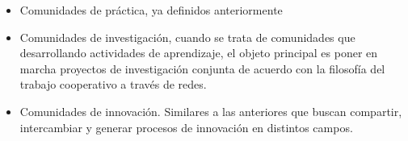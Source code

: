 \begin{description}
\begin{itemize}
\item Comunidades de práctica, ya definidos anteriormente
\item Comunidades de investigación, cuando se trata de comunidades que desarrollando actividades de aprendizaje, el objeto principal es poner en marcha proyectos de investigación conjunta de acuerdo con la filosofía del trabajo cooperativo a través de redes.
\item Comunidades de innovación. Similares a las anteriores que buscan compartir, intercambiar y generar procesos de innovación en distintos campos.
\end{itemize}
\end{description}

